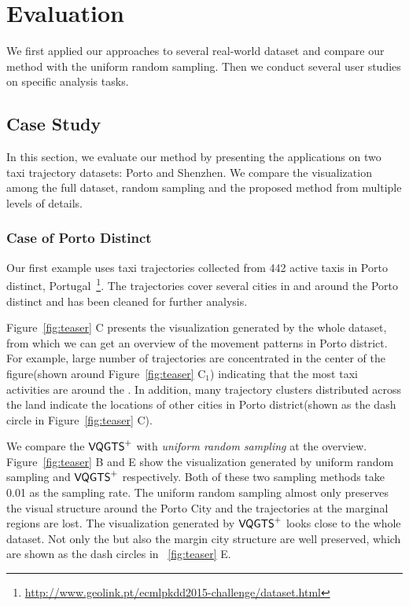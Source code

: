 \section{Evaluation}
We first applied our approaches to several real-world dataset and compare our method with the uniform random sampling. Then we conduct several user studies on specific analysis tasks. 
\subsection{Case Study}
In this section, we evaluate our method by presenting the applications on two taxi trajectory datasets: Porto and Shenzhen. We compare the visualization among the full dataset, random sampling and the proposed method from multiple levels of details. 
\subsubsection{Case of Porto Distinct}
Our first example uses taxi trajectories collected from 442 active taxis in Porto distinct, Portugal~\footnote{\url{http://www.geolink.pt/ecmlpkdd2015-challenge/dataset.html}}. The trajectories cover several cities in and around the Porto distinct and has been cleaned for further analysis.


Figure~\ref{fig:teaser} C presents the visualization generated by the whole dataset, from which we can get an overview of the movement patterns in Porto district. For example, large number of trajectories are concentrated in the center of the figure(shown around Figure~\ref{fig:teaser} C$_1$) indicating that the most taxi activities are around the . In addition, 
many trajectory clusters distributed across the land indicate the locations of other cities in Porto district(shown as the dash circle in Figure~\ref{fig:teaser} C). 

We compare the $\mathsf{VQGTS}^{+}$ with \textit{uniform random sampling} at the overview. 
Figure~\ref{fig:teaser} B and E show the visualization generated by uniform random sampling and $\mathsf{VQGTS}^{+}$ respectively. Both of these two sampling methods take 0.01 as the sampling rate. The uniform random sampling almost only preserves the visual structure around the Porto City and the trajectories at the marginal regions are lost.
The visualization generated by $\mathsf{VQGTS}^{+}$ looks close to the whole dataset. Not only the  but also the margin city structure are well preserved, which are shown as the dash circles in ~\ref{fig:teaser} E.
 
